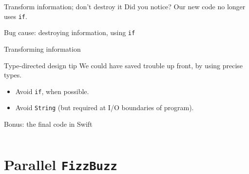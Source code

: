 \begin{frame}[fragile]{Transform information; don't destroy it}
  Did you notice? Our new code no longer uses \texttt{if}.

  \begin{block}{Bug cause: destroying information, using \texttt{if}} 
  \end{block}

  \begin{block}{Transforming information}
  \end{block}

  \begin{block}{Type-directed design tip}
    We could have saved trouble \alert{up front}, by using precise \alert{types}.
    \begin{itemize}
    \item Avoid \texttt{if}, when possible.
    \item Avoid \texttt{String} (but required at I/O boundaries of program).
    \end{itemize}
  \end{block}
\end{frame}

\begin{frame}[fragile]{Bonus: the final code in Swift}
  \inputminted{ocaml}{FizzBuzzFinal.swift}
\end{frame}


\section{Parallel \texttt{FizzBuzz}}

